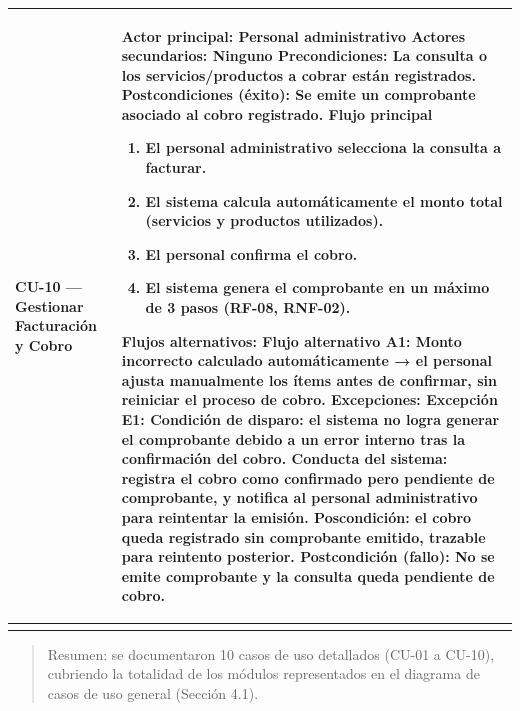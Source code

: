 \documentclass[
]{article}
\newcounter{none} %
\begin{document}
{\def\LTcaptype{none} %
\begin{longtable}[]{|
  >{\raggedright\arraybackslash}p{}|
  >{\raggedright\arraybackslash}p{}|}
\hline
\begin{minipage}[b]{\linewidth}\raggedright
\textbf{CU-10 --- Gestionar Facturación y Cobro}
\end{minipage} & \begin{minipage}[b]{\linewidth}\raggedright
\textbf{Actor principal:} Personal administrativo \textbf{Actores
secundarios:} Ninguno \textbf{Precondiciones:} La consulta o los
servicios/productos a cobrar están registrados. \textbf{Postcondiciones (éxito):} Se emite un comprobante asociado al
cobro registrado. \textbf{Flujo principal}

\begin{enumerate}
\def\labelenumi{\arabic{enumi}.}
\item
  El personal administrativo selecciona la consulta a facturar.
\item
  El sistema calcula automáticamente el monto total (servicios y
  productos utilizados).
\item
  El personal confirma el cobro.
\item
  El sistema genera el comprobante en un máximo de 3 pasos (RF-08,
  RNF-02).
\end{enumerate}

\textbf{Flujos alternativos:} Flujo alternativo A1: Monto incorrecto calculado automáticamente → el personal ajusta manualmente los ítems antes de confirmar, sin reiniciar el proceso de cobro.
\textbf{Excepciones:} Excepción E1: Condición de disparo: el sistema no logra generar el comprobante debido a un error interno tras la confirmación del cobro. Conducta del sistema: registra el cobro como confirmado pero pendiente de comprobante, y notifica al personal administrativo para reintentar la emisión. Poscondición: el cobro queda registrado sin comprobante emitido, trazable para reintento posterior.
\textbf{Postcondición (fallo):} No se emite comprobante y la consulta queda pendiente de cobro.
\end{minipage} \\
\hline
\endhead
\hline
\endlastfoot
\end{longtable}
}

\begin{quote}
Resumen: se documentaron 10 casos de uso detallados (CU-01 a CU-10),
cubriendo la totalidad de los módulos representados en el diagrama de
casos de uso general (Sección 4.1).
\end{quote}
\end{document}
